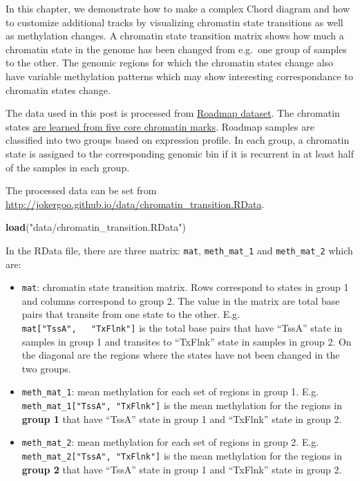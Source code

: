 \documentclass[]{book}
\newenvironment{Shaded}{\begin{snugshade}}{\end{snugshade}}
\newcommand{\KeywordTok}[1]{\textcolor[rgb]{0.13,0.29,0.53}{\textbf{#1}}}
\newcommand{\StringTok}[1]{\textcolor[rgb]{0.31,0.60,0.02}{#1}}
\newcommand{\NormalTok}[1]{#1}
\providecommand{\tightlist}{%
  \setlength{\itemsep}{0pt}\setlength{\parskip}{0pt}}
\begin{document}
In this chapter, we demonstrate how to make a complex Chord diagram and
how to customize additional tracks by visualizing chromatin state
transitions as well as methylation changes. A chromatin state transition
matrix shows how much a chromatin state in the genome has been changed
from e.g.~one group of samples to the other. The genomic regions for
which the chromatin states change also have variable methylation
patterns which may show interesting correspondance to chromatin states
change.

The data used in this post is processed from
\href{http://www.roadmapepigenomics.org/}{Roadmap dataset}. The
chromatin states
\href{http://egg2.wustl.edu/roadmap/web_portal/chr_s\%20tate_learning.html\#core_15state}{are
learned from five core chromatin marks}. Roadmap samples are classified
into two groups based on expression profile. In each group, a chromatin
state is assigned to the corresponding genomic bin if it is recurrent in
at least half of the samples in each group.

The processed data can be set from
\url{http://jokergoo.github.io/data/chromatin_transition.RData}.

\begin{Shaded}
\begin{Highlighting}[]
\KeywordTok{load}\NormalTok{(}\StringTok{"data/chromatin_transition.RData"}\NormalTok{)}
\end{Highlighting}
\end{Shaded}

In the RData file, there are three matrix: \texttt{mat},
\texttt{meth\_mat\_1} and \texttt{meth\_mat\_2} which are:

\begin{itemize}
\tightlist
\item
  \texttt{mat}: chromatin state transition matrix. Rows correspond to
  states in group 1 and columns correspond to group 2. The value in the
  matrix are total base pairs that transite from one state to the other.
  E.g. \texttt{mat{[}"TssA",\ \ \ "TxFlnk"{]}} is the total base pairs
  that have ``TssA'' state in samples in group 1 and transites to
  ``TxFlnk'' state in samples in group 2. On the diagonal are the
  regions where the states have not been changed in the two groups.
\item
  \texttt{meth\_mat\_1}: mean methylation for each set of regions in
  group 1. E.g. \texttt{meth\_mat\_1{[}"TssA",\ "TxFlnk"{]}} is the mean
  methylation for the regions in \textbf{group 1} that have ``TssA''
  state in group 1 and ``TxFlnk'' state in group 2.
\item
  \texttt{meth\_mat\_2}: mean methylation for each set of regions in
  group 2. E.g. \texttt{meth\_mat\_2{[}"TssA",\ "TxFlnk"{]}} is the mean
  methylation for the regions in \textbf{group 2} that have ``TssA''
  state in group 1 and ``TxFlnk'' state in group 2.
\end{itemize}
\end{document}
